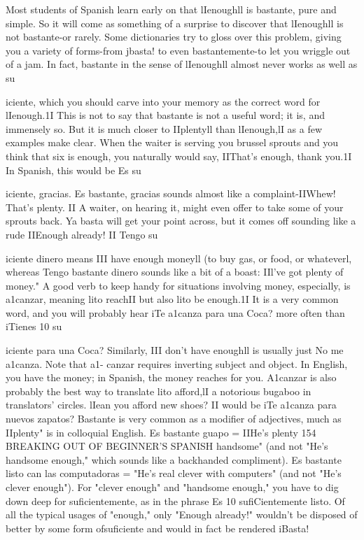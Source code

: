 \documentclass[14pt,a4paper,oneside]{memoir}
\begin{document}
Most students of Spanish learn early on that lIenoughll is bastante, pure and simple. So it will come as something of a surprise to
discover that lIenoughll is not bastante-or rarely. Some dictionaries
try to gloss over this problem, giving you a variety of forms-from
jbasta! to even bastantemente-to let you wriggle out of a jam. In
fact, bastante in the sense of lIenoughll almost never works as well as
su{iciente, which you should carve into your memory as the correct
word for lIenough.1I
This is not to say that bastante is not a useful word; it is,
and immensely so. But it is much closer to IIplentyll than lIenough,lI
as a few examples make clear. When the waiter is serving you brussel sprouts and you think that six is enough, you naturally would say,
IIThat's enough, thank you.1I In Spanish, this would be Es su{iciente,
gracias. Es bastante, gracias sounds almost like a complaint-IIWhew!
That's plenty. II A waiter, on hearing it, might even offer to take some
of your sprouts back. Ya basta will get your point across, but it comes
off sounding like a rude IIEnough already! II Tengo su{iciente dinero
means III have enough moneyll (to buy gas, or food, or whateverl,
whereas Tengo bastante dinero sounds like a bit of a boast: IIl've got
plenty of money."
A good verb to keep handy for situations involving money, especially, is a1canzar, meaning lito reachII but also lito be enough.1I It is
a very common word, and you will probably hear iTe a1canza para una
Coca? more often than iTienes 10 su{iciente para una Coca? Similarly,
III don't have enoughll is usually just No me a1canza. Note that a1-
canzar requires inverting subject and object. In English, you have the
money; in Spanish, the money reaches for you. A1canzar is also probably the best way to translate lito afford,lI a notorious bugaboo in translators' circles. lIean you afford new shoes? II would be iTe a1canza para
nuevos zapatos?
Bastante is very common as a modifier of adjectives, much as
IIplenty" is in colloquial English. Es bastante guapo = IIHe's plenty
154 BREAKING OUT OF BEGINNER'S SPANISH
handsome" (and not "He's handsome enough," which sounds like a
backhanded compliment). Es bastante listo can las computadoras =
"He's real clever with computers" (and not "He's clever enough"). For
"clever enough" and "handsome enough," you have to dig down deep
for suficientemente, as in the phrase Es 10 sufiCientemente listo.
Of all the typical usages of "enough," only "Enough already!"
wouldn't be disposed of better by some form ofsuficiente and would in
fact be rendered iBasta!

}}}}
\end{document}
